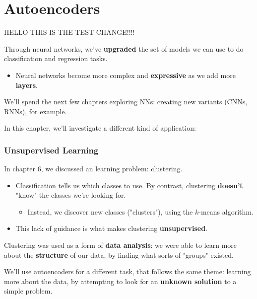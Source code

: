 \setcounter{chapter}{13-1}

\chapter{Autoencoders}

    HELLO THIS IS THE TEST CHANGE!!!!

    Through neural networks, we've \textbf{upgraded} the set of models we can use to do classification and regression tasks.

    \begin{itemize}
        \item Neural networks become more complex and \textbf{expressive} as we add more \textbf{layers}.
    \end{itemize}

    We'll spend the next few chapters exploring NNs: creating new variants (CNNs, RNNs), for example.
    
    In this chapter, we'll investigate a different kind of application: 

    \subsection{Unsupervised Learning}

        In chapter 6, we discussed an  learning problem: clustering.

        \begin{itemize}
            \item Classification tells us which classes to use. By contrast, clustering \textbf{doesn't} "know" the classes we're looking for.

            \begin{itemize}
                \item Instead, we discover new classes ("clusters"), using the $k$-means algorithm.
            \end{itemize}
            
            \item This lack of guidance is what makes clustering \textbf{unsupervised}.
        \end{itemize}

        Clustering was used as a form of \textbf{data analysis}: we were able to learn more about the \textbf{structure} of our data, by finding what sorts of "groups" existed.

        We'll use autoencoders for a different task, that follows the same theme: learning more about the data, by attempting to look for an \textbf{unknown solution} to a simple problem.

